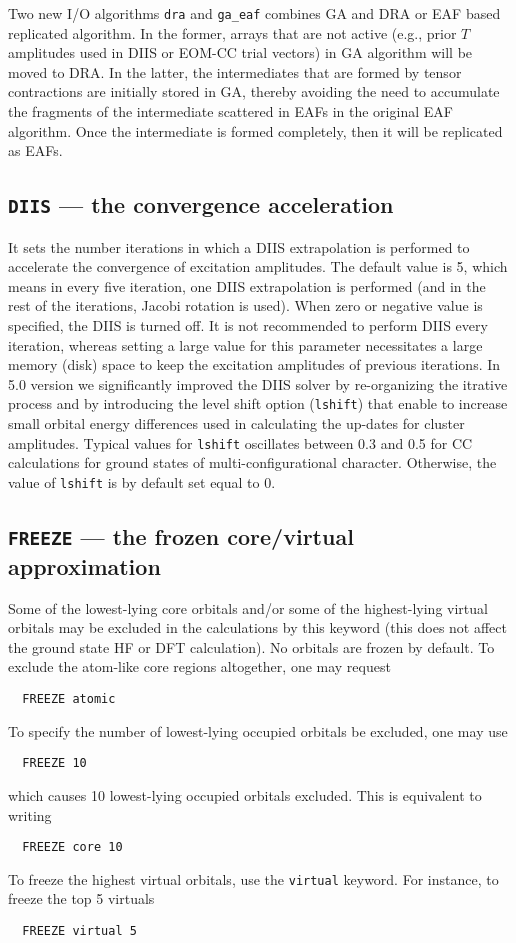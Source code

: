 Two new I/O algorithms \verb+dra+ and \verb+ga_eaf+ combines GA and DRA or EAF based replicated 
algorithm.  In the former, arrays that are not active (e.g., prior $T$ amplitudes used in DIIS
or EOM-CC trial vectors) in GA algorithm will be moved to DRA.  In the latter, the intermediates
that are formed by tensor contractions are initially stored in GA, thereby avoiding the need to
accumulate the fragments of the intermediate scattered in EAFs in the original EAF algorithm.
Once the intermediate is formed completely, then it will be replicated as EAFs.

\subsection{{\tt DIIS} --- the convergence acceleration}

It sets the number iterations in which a DIIS extrapolation is performed to accelerate
the convergence of excitation amplitudes.  The default value is 5, which means in every
five iteration, one DIIS extrapolation is performed (and in the rest of the iterations,
Jacobi rotation is used).  When zero or negative value is specified, the DIIS is turned
off.  It is not recommended to perform DIIS every iteration, whereas setting a large 
value for this parameter necessitates a large memory (disk) space to keep the excitation
amplitudes of previous iterations. In 5.0 version we significantly improved the DIIS solver
by re-organizing the itrative process and by introducing the level shift option 
({\tt lshift}) that enable to increase small orbital energy differences used in 
calculating the up-dates for cluster amplitudes. 
Typical values for {\tt lshift} oscillates between 0.3 and 0.5 for CC calculations for 
ground states of multi-configurational character.
Otherwise, the value of {\tt lshift} is by default set equal to 0.


\subsection{{\tt FREEZE} --- the frozen core/virtual approximation}

Some of the lowest-lying core orbitals and/or some of the highest-lying
virtual orbitals may be excluded in the calculations
by this keyword (this does not affect the ground state HF or DFT calculation).
No orbitals are frozen by default.  To exclude the atom-like
core regions altogether, one may request
\begin{verbatim}
  FREEZE atomic
\end{verbatim}
To specify the number of lowest-lying occupied orbitals be excluded, one may use
\begin{verbatim}
  FREEZE 10
\end{verbatim}
which causes 10 lowest-lying occupied orbitals excluded.
This is equivalent to writing
\begin{verbatim}
  FREEZE core 10
\end{verbatim}
To freeze the highest virtual orbitals, use the \verb+virtual+
keyword.  For instance, to freeze the top 5 virtuals
\begin{verbatim}
  FREEZE virtual 5
\end{verbatim}

